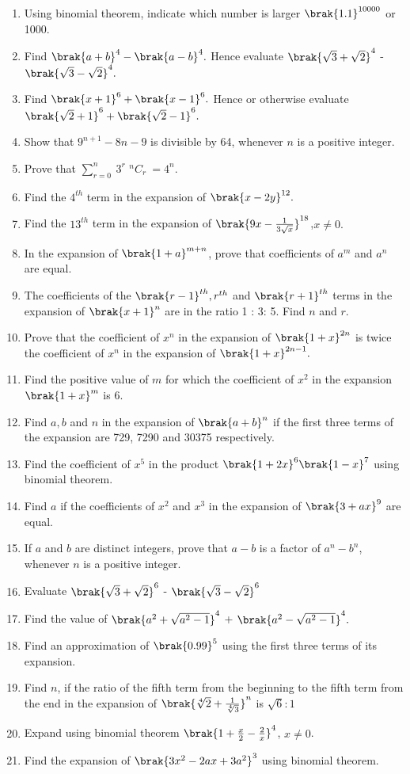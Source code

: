 \begin{enumerate}[label=\thesubsection.\arabic*, ref=\thesubsection.\theenumi,itemsep=1ex,resume*]
\item Using binomial theorem, indicate which number is larger $\brak{1.1}^{10000}$ or 1000.
\item Find $\brak{a+b}^4 - \brak{a-b}^4.$ Hence evaluate 
$\brak{\sqrt{3} + \sqrt{2}}^4$ - $\brak{\sqrt{3} - \sqrt{2}}^4.$
\item Find $\brak{x + 1}^6 + \brak{x - 1}^6.$ Hence or otherwise evaluate $\brak{\sqrt{2} + 1}^6 + \brak{\sqrt{2} - 1}^6.$
\item Show that $9^{n+1} - 8n - 9$ is divisible by 64, whenever $n$ is a positive integer.
\item Prove that $ \sum \limits_{r=0}^{n}\ 3^r$ $ ^nC_r\ = 4 ^n$.
\item Find the $4^{th}$ term in the expansion of $\brak{x - 2y}^{12}.$
\item Find the $13^{th}$ term in the expansion of $ \brak{9x - \frac{1}{3\sqrt{x}}}^{18}$,$ x \neq 0.$
\item In the expansion of $\brak{1 + a}^{m+n}$, prove that coefficients of $a^m$ and $a^n$ are equal.
\item The coefficients of the $\brak{r - 1}^{th}, r^{th}$ and $\brak{r + 1}^{th}$ terms in the expansion of $\brak{x + 1}^n$ are in the ratio 1 : 3: 5. Find $n$ and $r$.
\item Prove that the coefficient of $x^n$ in the expansion of $\brak{1 + x}^{2n}$ is twice the coefficient of $x^n$ in the expansion of $\brak{1 + x}^{2n - 1}.$
\item Find the positive value of $m$ for which the coefficient of $x^2$ in the expansion $\brak{1 + x}^m$ is 6.
\item Find $a, b$ and $n$ in the expansion of $\brak{a + b}^n$ if the first three terms of the expansion are 729, 7290 and 30375 respectively.
\item Find the coefficient of $x^5$ in the product $\brak{1 + 2x}^6 \brak{1 - x}^7$ using binomial theorem.
\item Find $a$ if the coefficients of $x^2$ and $x^3$ in the expansion of $\brak{3 + ax}^9$ are equal.
\item If $a$ and $b$ are distinct integers, prove that $a - b$ is a factor of $a^n - b^n$, whenever $n$ is a positive integer.
\item Evaluate $\brak{\sqrt{3} + \sqrt{2}}^6$ - $\brak{\sqrt{3} - \sqrt{2}}^6$
\item Find the value of $\brak{a^2 + \sqrt{a^2 - 1}}^4$ + $\brak{a^2 - \sqrt{a^2 - 1}}^4.$
\item Find an approximation of $\brak{0.99}^5$ using the first three terms of its expansion.
\item Find $n$, if the ratio of the fifth term from the beginning to the fifth term from the end in the expansion of $\brak{\sqrt[4]{2} + \frac{1}{\sqrt[4]{3}}}^n$ is $\sqrt{6} : 1$
\item Expand using binomial theorem $\brak{1 + \frac{x}{2} - \frac{2}{x}}^4$, $x \neq 0$.
\item Find the expansion of $\brak{3x^2 - 2ax + 3a^2}^3$ using binomial theorem.
\end{enumerate}
